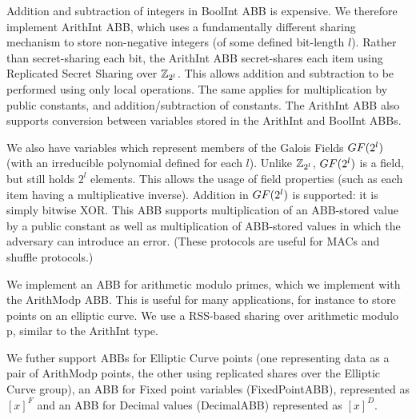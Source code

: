 Addition and subtraction of integers in BoolInt ABB is expensive.
We therefore implement ArithInt ABB, which uses a fundamentally different sharing
mechanism to store non-negative integers (of some defined bit-length $l$).
Rather than secret-sharing each bit, the ArithInt ABB secret-shares each item
using Replicated Secret Sharing over $\mathbb{Z}_{2^l}$. 
This allows addition and subtraction to be performed using only local operations.
The same applies for multiplication by public constants,
and addition/subtraction of constants.
The ArithInt ABB also supports conversion between variables stored in the
ArithInt and BoolInt ABBs.

We also have variables which represent members of the Galois Fields $GF(2^l)$
(with an irreducible polynomial defined for each $l$).
Unlike $\mathbb{Z}_{2^l}$, $GF(2^l)$ is a field, but still holds $2^l$ elements.
This allows the usage of field properties (such as each item having a multiplicative inverse).
Addition in $GF(2^l)$ is supported: it is simply bitwise XOR.
This ABB supports multiplication of an ABB-stored value by a public constant
as well as multiplication of ABB-stored values in which the adversary
can introduce an error.
(These protocols are useful for MACs and shuffle protocols.)

We implement an ABB for arithmetic modulo primes, which we implement with the
ArithModp ABB.
This is useful for many applications, for instance to store points on an elliptic curve.
We use a RSS-based sharing over arithmetic modulo p, similar to the ArithInt type.

We futher support ABBs for Elliptic Curve points
(one representing data as a pair of ArithModp points, 
the other using replicated shares over the Elliptic Curve group),
an ABB for Fixed point variables (FixedPointABB), represented as $[x]^F$
and an ABB for Decimal values (DecimalABB) represented as $[x]^D$.

